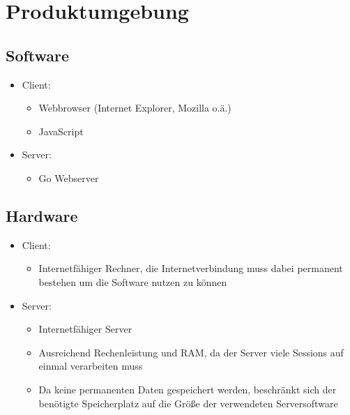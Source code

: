 \section{Produktumgebung}

\subsection{Software}
	\begin{itemize}
		\item Client:
		\begin{itemize}
			\item Webbrowser (Internet Explorer, Mozilla o.ä.)
			\item JavaScript
		\end{itemize}
		\item Server: 
		\begin{itemize}
			\item Go Webserver
		\end{itemize}
	\end{itemize}

\subsection{Hardware}
	\begin{itemize}
		\item Client:
		\begin{itemize}
			\item Internetfähiger Rechner, die Internetverbindung muss dabei permanent bestehen um die Software nutzen zu können
		\end{itemize}
		\item Server: 
		\begin{itemize}
			\item Internetfähiger Server
			\item Ausreichend Rechenleistung und RAM, da der Server viele Sessions auf einmal verarbeiten muss
			\item Da keine permanenten Daten gespeichert werden, beschränkt sich der benötigte Speicherplatz auf die Größe der verwendeten Serversoftware
		\end{itemize}
	\end{itemize}